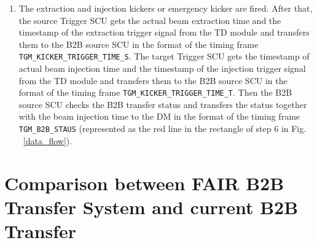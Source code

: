 \begin{enumerate}
\item  The extraction and injection kickers or emergency kicker are fired. After that, the source Trigger SCU gets the actual beam extraction time and the timestamp of the extraction trigger signal from the TD module and transfers them to the B2B source SCU in the format of the timing frame \verb|TGM_KICKER_TRIGGER_TIME_S|. The target Trigger SCU gets the timestamp of actual beam injection time and the timestamp of the injection trigger signal from the TD module and transfers them to the B2B source SCU in the format of the timing frame \verb|TGM_KICKER_TRIGGER_TIME_T|. Then the B2B source SCU checks the B2B transfer status and transfers the status together with the beam injection time to the DM in the format of the timing frame \verb|TGM_B2B_STAUS| (represented as the red line in the rectangle of step 6 in Fig. ~\ref{data_flow}).

\end{enumerate}

\section{Comparison between FAIR B2B Transfer System and current B2B Transfer}



